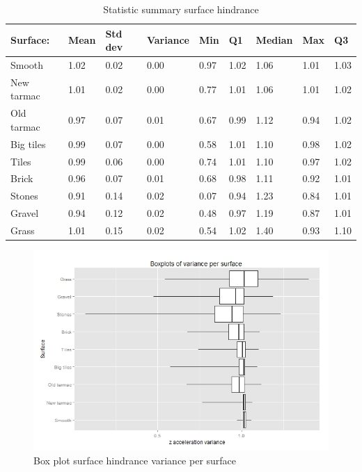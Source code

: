 \begin{table}[ht]
\caption{Statistic summary surface hindrance \label{surfacehindrance}}
\centering
\begin{tabular}{|p{46pt}|p{30pt}|p{30pt}|p{30pt}|p{30pt}|p{30pt}|p{30pt}|p{30pt}|p{30pt}|}
\hline
Surface: & Mean & Std dev & Variance & Min & Q1 & Median & Max & Q3\\
\hline
Smooth & 1.02 & 0.02 & 0.00 & 0.97 & 1.02  & 1.06 & 1.01 & 1.03 \\
New tarmac  & 1.01  & 0.02  & 0.00  & 0.77  & 1.01  & 1.06 & 1.01  & 1.02\\
Old tarmac & 0.97 & 0.07 & 0.01 & 0.67 & 0.99 & 1.12 & 0.94 & 1.02\\
Big tiles & 0.99 & 0.07 & 0.00 & 0.58 & 1.01 & 1.10 & 0.98 & 1.02\\
Tiles & 0.99 & 0.06 & 0.00 & 0.74 & 1.01 & 1.10 & 0.97 & 1.02\\
Brick & 0.96 & 0.07 & 0.01 & 0.68 & 0.98 & 1.11 & 0.92 & 1.01\\
Stones & 0.91 & 0.14 & 0.02 & 0.07 & 0.94 & 1.23 & 0.84 & 1.01\\
Gravel & 0.94 & 0.12 & 0.02 & 0.48 & 0.97 & 1.19 & 0.87 & 1.01\\
Grass & 1.01 & 0.15 & 0.02 & 0.54 & 1.02 & 1.40 & 0.93 & 1.10\\
\hline
\end{tabular}
\end{table}

\begin{figure}[hb]
\includegraphics[width=\textwidth]{img/R_Surfaces_Variance.jpeg}
\centering
\caption{Box plot surface hindrance variance per surface \label{boxhindrance}}
\end{figure} 

